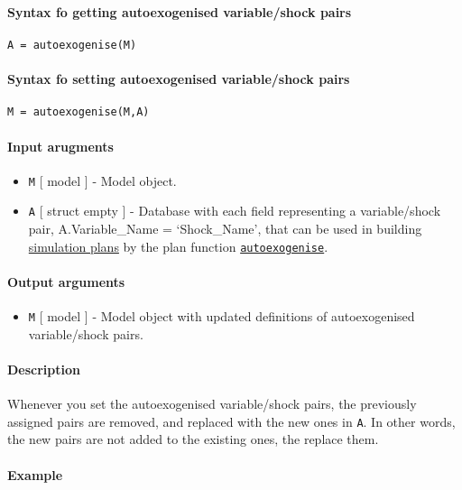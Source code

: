 


	\paragraph{Syntax fo getting autoexogenised variable/shock
pairs}\label{syntax-fo-getting-autoexogenised-variableshock-pairs}

\begin{verbatim}
A = autoexogenise(M)
\end{verbatim}

\paragraph{Syntax fo setting autoexogenised variable/shock
pairs}\label{syntax-fo-setting-autoexogenised-variableshock-pairs}

\begin{verbatim}
M = autoexogenise(M,A)
\end{verbatim}

\paragraph{Input arugments}\label{input-arugments}

\begin{itemize}
\item
  \texttt{M} {[} model {]} - Model object.
\item
  \texttt{A} {[} struct \textbar{} empty {]} - Database with each field
  representing a variable/shock pair, A.Variable\_Name = `Shock\_Name',
  that can be used in building \href{plan/Contents}{simulation plans} by
  the plan function \href{plan/autoexogenise}{\texttt{autoexogenise}}.
\end{itemize}

\paragraph{Output arguments}\label{output-arguments}

\begin{itemize}
\itemsep1pt\parskip0pt
\item
  \texttt{M} {[} model {]} - Model object with updated definitions of
  autoexogenised variable/shock pairs.
\end{itemize}

\paragraph{Description}\label{description}

Whenever you set the autoexogenised variable/shock pairs, the previously
assigned pairs are removed, and replaced with the new ones in
\texttt{A}. In other words, the new pairs are not added to the existing
ones, the replace them.

\paragraph{Example}\label{example}


